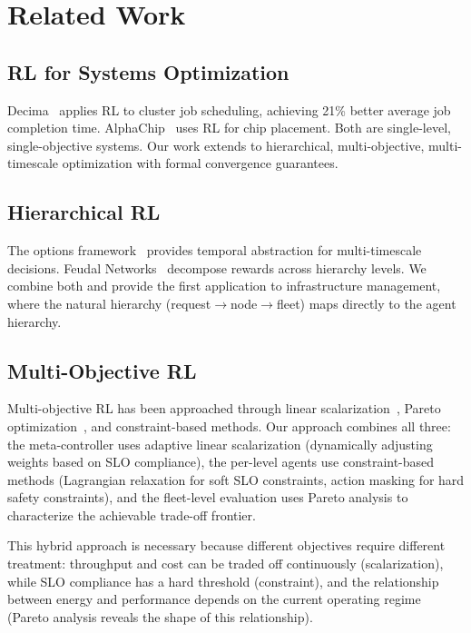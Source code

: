 \documentclass[conference,10pt]{IEEEtran}
\begin{document}
\section{Related Work}
\label{sec:related}

\subsection{RL for Systems Optimization}

Decima~\cite{mao2019learning} applies RL to cluster job scheduling, achieving 21\% better average job completion time. AlphaChip~\cite{mirhoseini2021graph} uses RL for chip placement. Both are single-level, single-objective systems. Our work extends to hierarchical, multi-objective, multi-timescale optimization with formal convergence guarantees.

\subsection{Hierarchical RL}

The options framework~\cite{sutton1999options} provides temporal abstraction for multi-timescale decisions. Feudal Networks~\cite{vezhnevets2017feudal} decompose rewards across hierarchy levels. We combine both and provide the first application to infrastructure management, where the natural hierarchy (request$\to$node$\to$fleet) maps directly to the agent hierarchy.


\subsection{Multi-Objective RL}

Multi-objective RL has been approached through linear scalarization~\cite{roijers2013survey}, Pareto optimization~\cite{van2014multi}, and constraint-based methods. Our approach combines all three: the meta-controller uses adaptive linear scalarization (dynamically adjusting weights based on SLO compliance), the per-level agents use constraint-based methods (Lagrangian relaxation for soft SLO constraints, action masking for hard safety constraints), and the fleet-level evaluation uses Pareto analysis to characterize the achievable trade-off frontier.

This hybrid approach is necessary because different objectives require different treatment: throughput and cost can be traded off continuously (scalarization), while SLO compliance has a hard threshold (constraint), and the relationship between energy and performance depends on the current operating regime (Pareto analysis reveals the shape of this relationship).
\end{document}
